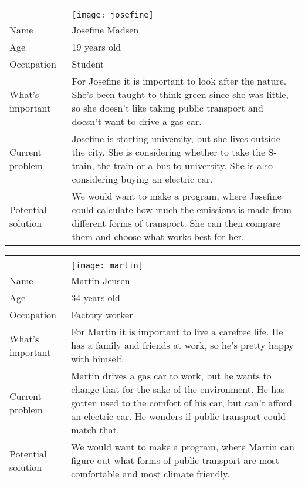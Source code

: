 \noindent
\begin{tabularx}{\textwidth}{ | l X | }
    \hline
    &                                                  \\
    & \texttt{[image: josefine]} \\
    Name       & Josefine Madsen                                  \\
    Age        & 19 years old                                     \\
    Occupation & Student                                          \\
    What's important & For Josefine it is important to look after the nature.
    She's been taught to think green since she was little, so she doesn't like taking public transport and doesn't want
    to drive a gas car. \\
    Current problem & Josefine is starting university, but she lives outside the city.
    She is considering whether to take the S-train, the train or a bus to university.
    She is also considering buying an electric car. \\
    Potential solution & We would want to make a program, where Josefine could calculate how much the emissions is made
    from different forms of transport.
    She can then compare them and choose what works best for her. \\
    \hline
\end{tabularx}

\noindent
\begin{tabularx}{\textwidth}{ | l X | }
    \hline
    &                                                \\
    & \texttt{[image: martin]} \\
    Name       & Martin Jensen                                  \\
    Age        & 34 years old                                   \\
    Occupation & Factory worker                                 \\
    What's important & For Martin it is important to live a carefree life.
    He has a family and friends at work, so he's pretty happy with himself. \\
    Current problem & Martin drives a gas car to work, but he wants to change that for the sake of the environment.
    He has gotten used to the comfort of his car, but can't afford an electric car.
    He wonders if public transport could match that. \\
    Potential solution & We would want to make a program, where Martin can figure out what forms of public transport are
    most comfortable and most climate friendly. \\
    \hline
\end{tabularx}

